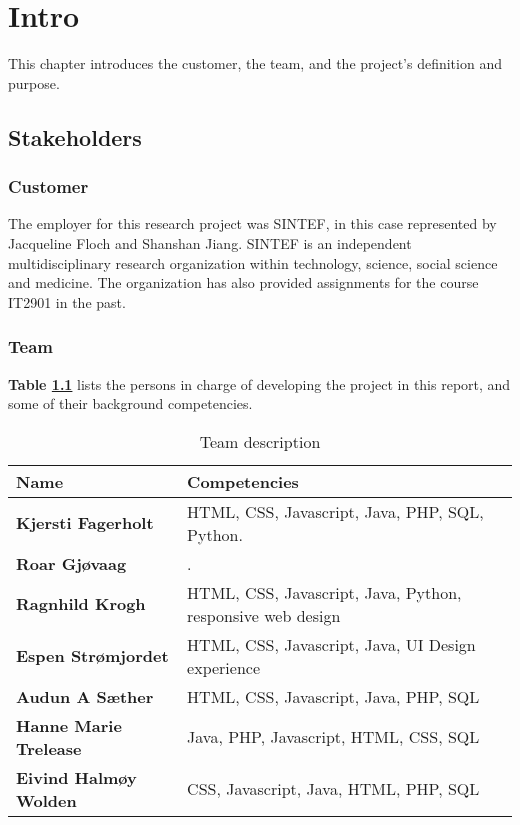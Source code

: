 
\chapter{Intro}

This chapter introduces the customer, the team, and the project's definition and purpose.

\section{Stakeholders}

\subsection{Customer}

The employer for this research project was SINTEF, in this case represented by Jacqueline Floch and Shanshan Jiang. SINTEF is an independent multidisciplinary research organization within technology, science, social science and medicine. The organization has also provided assignments for the course IT2901 in the past.

\subsection{Team}

\textbf{Table \ref{Tab_team}} lists the persons in charge of developing the project in this report, and some of their background competencies.

\begin{table}[!h]
	\begin{center}
		\begin{tabular}{  l  l }
			\textbf{Name} & \textbf{Competencies} \\ \hline
			\textbf{Kjersti Fagerholt} & HTML, CSS, Javascript, Java, PHP, SQL, Python. \\ 
			\textbf{Roar Gjøvaag} & . \\ 
			\textbf{Ragnhild Krogh} & HTML, CSS, Javascript, Java, Python, responsive web design \\ 
			\textbf{Espen Strømjordet} & HTML, CSS, Javascript, Java,
			UI Design experience \\ 
			\textbf{Audun A Sæther} & HTML, CSS, Javascript, Java, PHP, SQL \\ 
			\textbf{Hanne Marie Trelease} & Java, PHP, Javascript, HTML, CSS, SQL \\ 
			\textbf{Eivind Halmøy Wolden} & CSS, Javascript, Java, HTML, PHP, SQL \\ 
		\end{tabular}
	\end{center}
	\caption{Team description}
	\label{Tab_team}
\end{table}

